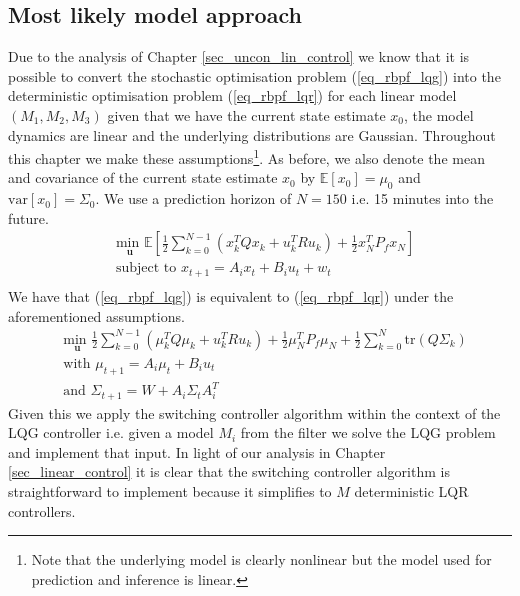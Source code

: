 \subsection{Most likely model approach}
\label{sec_rbpf_control_uncon}
Due to the analysis of Chapter \ref{sec_uncon_lin_control} we know that it is possible to convert the stochastic optimisation problem (\ref{eq_rbpf_lqg}) into the deterministic optimisation problem (\ref{eq_rbpf_lqr}) for each linear model $(M_1, M_2, M_3)$ given that we have the current state estimate $x_0$, the model dynamics are linear and the underlying distributions are Gaussian. Throughout this chapter we make these assumptions\footnote{Note that the underlying model is clearly nonlinear but the model used for prediction and inference is linear.}. As before, we also denote the mean and covariance of the current state estimate $x_0$ by $\mathbb{E}[x_0]=\mu_0$ and $\text{var}[x_0]=\Sigma_0$. We use a prediction horizon of $N=150$ i.e. 15 minutes into the future.
\begin{equation}
\begin{aligned}
&\underset{\mathbf{u}}{\text{min }} \mathbb{E}\left[ \frac{1}{2}\sum_{k=0}^{N-1} \left( x_k^TQx_k + u_k^TRu_k \right) + \frac{1}{2}x_N^TP_fx_N \right] \\
& \text{subject to } x_{t+1}=A_ix_t+B_iu_t + w_t\\
\end{aligned}
\label{eq_rbpf_lqg}
\end{equation}
We have that (\ref{eq_rbpf_lqg}) is equivalent to (\ref{eq_rbpf_lqr}) under the aforementioned assumptions.
\begin{equation}
\begin{aligned}
&\underset{\mathbf{u}}{\text{min }} \frac{1}{2}\sum_{k=0}^{N-1} \left( \mu_k^TQ\mu_k + u_k^TRu_k \right) + \frac{1}{2}\mu_N^TP_f\mu_N + \frac{1}{2}\sum_{k=0}^N \text{tr}(Q\Sigma_k) \\
&\text{with } \mu_{t+1} = A_i\mu_t +B_iu_t \\
&\text{and } \Sigma_{t+1} = W+A_i\Sigma_t A_i^T 
\end{aligned}
\label{eq_rbpf_lqr}
\end{equation}
Given this we apply the switching controller algorithm within the context of the LQG controller i.e. given a model $M_i$ from the filter we solve the LQG problem and implement that input. In light of our analysis in Chapter \ref{sec_linear_control} it is clear that the switching controller algorithm is straightforward to implement because it simplifies to $M$ deterministic LQR controllers.

